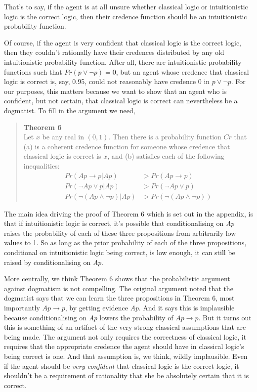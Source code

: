 \documentclass[
  11pt,
  letterpaper,
  DIV=11,
  numbers=noendperiod,
  oneside]{scrartcl}
\begin{document}
That's to say, if the agent is at all unsure whether classical logic or
intuitionistic logic is the correct logic, then their credence function
should be an intuitionistic probability function.

Of course, if the agent is very confident that classical logic is the
correct logic, then they couldn't rationally have their credences
distributed by any old intuitionistic probability function. After all,
there are intuitionistic probability functions such that
\(Pr(p \vee \neg p) = 0\), but an agent whose credence that classical
logic is correct is, say, 0.95, could not reasonably have credence 0 in
\(p \vee \neg p\). For our purposes, this matters because we want to
show that an agent who is confident, but not certain, that classical
logic is correct can nevertheless be a dogmatist. To fill in the
argument we need,

\begin{quote}
\textbf{Theorem 6}\\
Let \(x\) be any real in \((0, 1)\). Then there is a probability
function \(Cr\) that (a) is a coherent credence function for someone
whose credence that classical logic is correct is \(x\), and (b)
satisfies each of the following inequalities: \[
\begin{aligned}
Pr(Ap \rightarrow p | Ap) &> Pr(Ap \rightarrow p) \\
Pr(\neg Ap \vee p | Ap) &> Pr(\neg Ap \vee p) \\
Pr(\neg(Ap \wedge \neg p) | Ap) &> Pr(\neg(Ap \wedge \neg p)) 
\end{aligned}
\]
\end{quote}

The main idea driving the proof of Theorem 6 which is set out in the
appendix, is that if intuitionistic logic is correct, it's possible that
conditionalising on \emph{Ap} raises the probability of each of these
three propositions from arbitrarily low values to 1. So as long as the
prior probability of each of the three propositions, conditional on
intuitionistic logic being correct, is low enough, it can still be
raised by conditionalising on \emph{Ap}.

More centrally, we think Theorem 6 shows that the probabilistic argument
against dogmatism is not compelling. The original argument noted that
the dogmatist says that we can learn the three propositions in Theorem
6, most importantly \(Ap \rightarrow p\), by getting evidence \emph{Ap}.
And it says this is implausible because conditionalising on \emph{Ap}
lowers the probability of \(Ap \rightarrow p\). But it turns out this is
something of an artifact of the very strong classical assumptions that
are being made. The argument not only requires the correctness of
classical logic, it requires that the appropriate credence the agent
should have in classical logic's being correct is one. And that
assumption is, we think, wildly implausible. Even if the agent should be
\emph{very confident} that classical logic is the correct logic, it
shouldn't be a requirement of rationality that she be absolutely certain
that it is correct.
\end{document}
